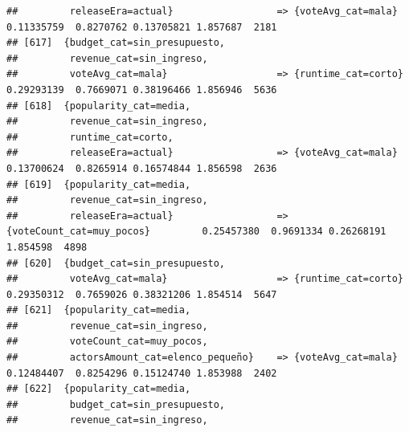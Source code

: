 \documentclass[
]{article}
\begin{document}
\begin{verbatim}
##         releaseEra=actual}                  => {voteAvg_cat=mala}                0.11335759  0.8270762 0.13705821 1.857687  2181
## [617]  {budget_cat=sin_presupuesto,                                                                                             
##         revenue_cat=sin_ingreso,                                                                                                
##         voteAvg_cat=mala}                   => {runtime_cat=corto}               0.29293139  0.7669071 0.38196466 1.856946  5636
## [618]  {popularity_cat=media,                                                                                                   
##         revenue_cat=sin_ingreso,                                                                                                
##         runtime_cat=corto,                                                                                                      
##         releaseEra=actual}                  => {voteAvg_cat=mala}                0.13700624  0.8265914 0.16574844 1.856598  2636
## [619]  {popularity_cat=media,                                                                                                   
##         revenue_cat=sin_ingreso,                                                                                                
##         releaseEra=actual}                  => {voteCount_cat=muy_pocos}         0.25457380  0.9691334 0.26268191 1.854598  4898
## [620]  {budget_cat=sin_presupuesto,                                                                                             
##         voteAvg_cat=mala}                   => {runtime_cat=corto}               0.29350312  0.7659026 0.38321206 1.854514  5647
## [621]  {popularity_cat=media,                                                                                                   
##         revenue_cat=sin_ingreso,                                                                                                
##         voteCount_cat=muy_pocos,                                                                                                
##         actorsAmount_cat=elenco_pequeño}    => {voteAvg_cat=mala}                0.12484407  0.8254296 0.15124740 1.853988  2402
## [622]  {popularity_cat=media,                                                                                                   
##         budget_cat=sin_presupuesto,                                                                                             
##         revenue_cat=sin_ingreso,                                                                                                

\end{verbatim}
\end{document}
